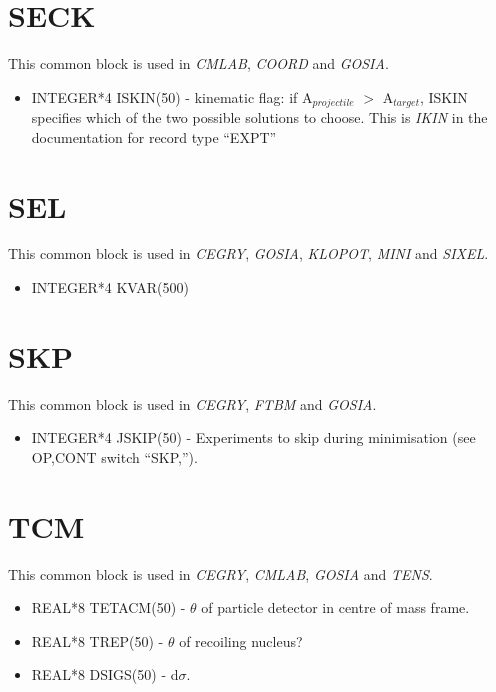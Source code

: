 \section{SECK}

This common block is used in {\em CMLAB}, {\em COORD} and {\em GOSIA}.

\begin{itemize}
\item INTEGER*4 ISKIN(50) - kinematic flag: if A$_{projectile}$ $>$
A$_{target}$, ISKIN specifies which of the two possible solutions to choose.
This is {\em IKIN} in the documentation for record type ``EXPT''
\end{itemize}

\section{SEL}

This common block is used in {\em CEGRY}, {\em GOSIA}, {\em KLOPOT}, {\em
MINI} and {\em SIXEL}.

\begin{itemize}
\item INTEGER*4 KVAR(500)
\end{itemize}

\section{SKP}

This common block is used in {\em CEGRY}, {\em FTBM} and {\em GOSIA}.

\begin{itemize}
\item INTEGER*4 JSKIP(50) - Experiments to skip during minimisation (see
OP,CONT switch ``SKP,'').
\end{itemize}

\section{TCM}

This common block is used in {\em CEGRY}, {\em CMLAB}, {\em GOSIA} and {\em
TENS}.

\begin{itemize}
\item REAL*8 TETACM(50) - $\theta$ of particle detector in centre of mass
frame.
\item REAL*8 TREP(50) - $\theta$ of recoiling nucleus?
\item REAL*8 DSIGS(50) - d$\sigma$.
\end{itemize}

